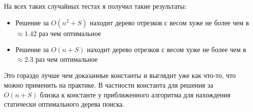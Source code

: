 На всех таких случайных тестах я получил такие результаты:

\begin{itemize}
    \item Решение за $O(n^2 + S)$ находит
    дерево отрезков с весом хуже не более чем в $\approx 1.42$ раз чем оптимальное
    \item Решение за $O(n + S)$ находит
    дерево отрезков с весом хуже не более чем в $\approx 2.3$ раз чем оптимальное
\end{itemize}

Это гораздо лучше чем доказанные константы и выглядит уже как что-то, что можно применить на практике. В частности константа для решения за $O(n + S)$ близка к константе у приближенного алгоритма для нахождения статически оптимального дерева поиска.
